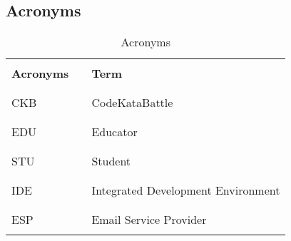 \subsection{Acronyms}
\begin{table}[H]
    \centering
    \renewcommand{\arraystretch}{0.5}
    \begin{tabular}{l l p{11cm}}
        \hline
                          &        &                                    \\
        \textbf{Acronyms} & \vline & \textbf{Term}                      \\
                          &        &                                    \\\hline & & \\
        CKB               & \vline & CodeKataBattle                     \\
                          &        &                                    \\\hline & & \\
        EDU               & \vline & Educator                           \\
                          &        &                                    \\\hline & & \\
        STU               & \vline & Student                            \\
                          &        &                                    \\\hline & & \\
        IDE               & \vline & Integrated Development Environment \\
                          &        &                                    \\\hline & & \\
        ESP               & \vline & Email Service Provider             \\
                          &        &                                    \\
        \hline
    \end{tabular}
    \caption{Acronyms}
\end{table}

